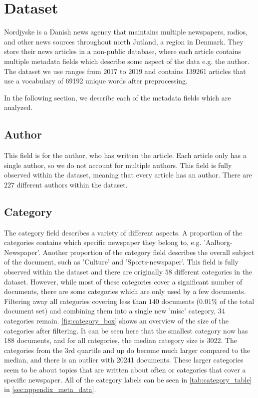 \section{Dataset}\label{sec:dataset}
Nordjyske is a Danish news agency that maintains multiple newspapers, radios, and other news sources throughout north Jutland, a region in Denmark.
They store their news articles in a non-public database, where each article contains multiple metadata fields which describe some aspect of the data e.g. the author.
The dataset we use ranges from 2017 to 2019 and contains 139261 articles that use a vocabulary of 69192 unique words after preprocessing.

In the following section, we describe each of the metadata fields which are analyzed.

\subsection{Author}
This field is for the author, who has written the article.
Each article only has a single author, so we do not account for multiple authors.
This field is fully observed within the dataset, meaning that every article has an author.
There are $227$ different authors within the dataset.

\subsection{Category}
The category field describes a variety of different aspects.
A proportion of the categories contains which specific newspaper they belong to, e.g. 'Aalborg-Newspaper'.
Another proportion of the category field describes the overall subject of the document, such as 'Culture' and 'Sports-newspaper'.
This field is fully observed within the dataset and there are originally $58$ different categories in the dataset.
However, while most of these categories cover a significant number of documents, there are some categories which are only used by a few documents.
Filtering away all categories covering less than $140$ documents ($0.01\%$ of the total document set) and combining them into a single new 'misc' category, $34$ categories remain.
\autoref{fig:category_box} shows an overview of the size of the categories after filtering.
It can be seen here that the smallest category now has 188 documents, and for all categories, the median category size is 3022.
The categories from the 3rd quartile and up do become much larger compared to the median, and there is an outlier with 20241 documents.
These larger categories seem to be about topics that are written about often or categories that cover a specific newspaper.
All of the category labels can be seen in \autoref{tab:category_table} in \autoref{sec:appendix_meta_data}.

